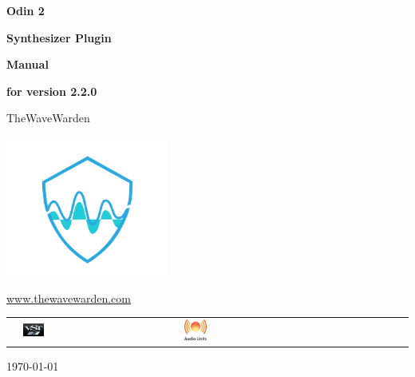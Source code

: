 

\pagecolor{white!95!black}
\setlength{\parindent}{0pt}
\begin{titlepage}
	\centering
	{\Huge\bfseries Odin 2\par}
	{\huge\bfseries Synthesizer Plugin\par}
	\vspace{2cm}
	{\Huge\bfseries Manual\par}
	{\Large\bfseries for version 2.2.0\par}
	\vspace{2cm}
	{\Large TheWaveWarden\par}
	\includegraphics[width=0.4\textwidth]{graphics/logo.png}\par
	{\large \url{www.thewavewarden.com}\par}

	\vspace{20mm}

	\begin{center}
		\begin{tabular}{p{}p{}p{}p{}p{}}
			&\includegraphics[width=0.15\textwidth]{graphics/vst3_logo.png}& & \includegraphics[width=0.11\textwidth]{graphics/au_logo.png}&
		\end{tabular}
	\end{center}

	\vfill

	{\large \today\par}
\end{titlepage}
\clearpage

\tableofcontents
\clearpage


\clearpage

\clearpage

\clearpage

\clearpage

\clearpage

\clearpage

\clearpage

\clearpage

\clearpage

